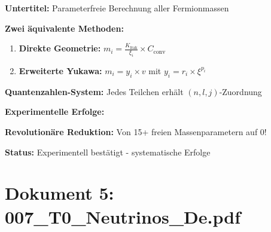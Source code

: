 	\begin{documentbox}
		\textbf{Untertitel:} Parameterfreie Berechnung aller Fermionmassen
		
		\textbf{Zwei äquivalente Methoden:}
		\begin{enumerate}
			\item \textbf{Direkte Geometrie:} $m_i = \frac{K_{\text{frak}}}{\xi_i} \times C_{\text{conv}}$
			\item \textbf{Erweiterte Yukawa:} $m_i = y_i \times v$ mit $y_i = r_i \times \xi^{p_i}$
		\end{enumerate}
		
		\textbf{Quantenzahlen-System:} Jedes Teilchen erhält $(n,l,j)$-Zuordnung
		
		\textbf{Experimentelle Erfolge:}
		\begin{center}
		\end{center}
		
		\textbf{Revolutionäre Reduktion:} Von 15+ freien Massenparametern auf 0!
		
		\textbf{Status:} Experimentell bestätigt - systematische Erfolge
	\end{documentbox}
	
	\section{Dokument 5: 007\_T0\_Neutrinos\_De.pdf}
	
